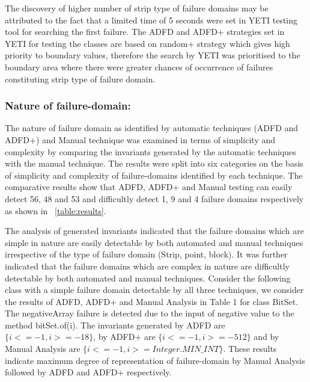 \documentclass[runningheads,a4paper]{llncs}
\begin{document}
The discovery of higher number of strip type of failure domains may be attributed to the fact that a limited time of 5 seconds were set in YETI testing tool for searching the first failure. The ADFD and ADFD+ strategies set in YETI for testing the classes are based on random+ strategy which gives high priority to boundary values, therefore the search by YETI was prioritised to the boundary area where there were greater chances of occurrence of failures constituting strip type of failure domain.


\subsubsection{Nature of failure-domain:}
The nature of failure domain as identified by automatic techniques (ADFD and ADFD+) and Manual technique was examined in terms of simplicity and complexity by comparing the invariants generated by the automatic techniques with the manual technique. The results were split into six categories on the basis of simplicity and complexity of failure-domains identified by each technique. The comparative results show that ADFD, ADFD+ and Manual testing can easily detect 56, 48 and 53 and difficultly detect 1, 9 and 4 failure domains respectively as shown in ~\ref{table:results}.

The analysis of generated invariants indicated that the failure domains which are simple in nature are easily detectable by both automated and manual techniques irrespective of the type of failure domain (Strip, point, block). It was further indicated that the failure domains which are complex in nature are difficultly detectable by both automated and manual techniques. %
Consider the following class with a simple failure domain detectable by all three techniques, we consider the results of ADFD, ADFD+ and Manual Analysis in Table 1 for class BitSet. The negativeArray failure is detected due to the input of negative value to the method bitSet.of(i). The invariants generated by ADFD are $\{i <= -1, i >= -18\}$, by ADFD+ are $\{i <= -1, i >= -512\}$ and by Manual Analysis are $\{i <= -1, i >= Integer.MIN\_INT\}$. These results indicate maximum degree of representation of failure-domain by Manual Analysis followed by ADFD and ADFD+ respectively.
\end{document}
